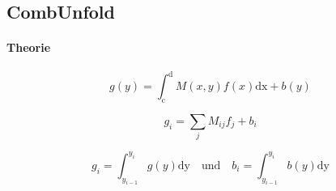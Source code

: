 \subsection{CombUnfold}%
\label{sub:combunfold}
\paragraph{Theorie}%
\label{par:theorie}

\begin{equation}
	g(y) = \int_\text{c}^\text{d} M(x,y) f(x) \text{dx} + b(y)
\end{equation}

\begin{equation}
	g_i = \sum_j M_{ij} f_j + b_i
\end{equation}

\begin{equation}
	g_i = \int_{y_{i-1}}^{y_i} g(y) \text{dy} \quad \text{und} \quad
	b_i = \int_{y_{i-1}}^{y_i} b(y) \text{dy}
\end{equation}

